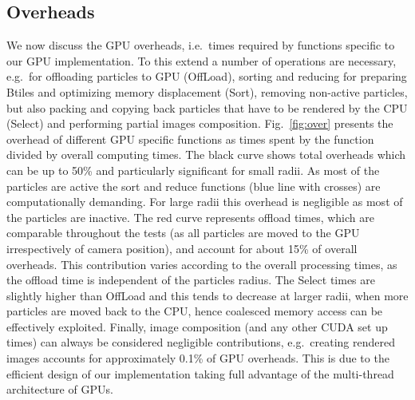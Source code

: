 \documentclass[smallextended]{svjour3}
\begin{document}
\subsection{Overheads}
\label{sec:overhead}
We now discuss the GPU overheads, i.e.\ times required by functions specific to our GPU implementation. To this extend a number of operations are necessary, e.g.\ for offloading particles to GPU (OffLoad), sorting and reducing for preparing Btiles and optimizing memory displacement (Sort), removing non-active particles, but also packing and copying back particles that have to be rendered by the CPU (Select) and performing partial images composition. Fig.~\ref{fig:over} presents the overhead of different GPU specific functions as times spent by the function divided by overall computing times. The black curve shows total overheads which can be up to 50\% and particularly significant for small radii. As most of the particles are active the sort and reduce
functions (blue line with crosses) are computationally demanding. For large radii this overhead is negligible as most of the particles are inactive. 
The red curve represents offload times, which are comparable throughout the tests (as all particles are moved to the GPU irrespectively of camera position), and account for about 15\% of overall overheads. This contribution varies according to the overall processing times, as the offload time is independent of the particles radius.
The Select times are slightly higher than OffLoad and this tends to decrease at larger radii, when more particles are moved back to the CPU, hence coalesced memory access can be effectively exploited. Finally, image composition (and any other CUDA set up times) can always be considered negligible contributions, e.g.\ creating rendered images accounts for approximately 0.1\% of GPU overheads. This is due to the efficient design of our implementation taking full advantage of the multi-thread architecture of GPUs.
\end{document}
